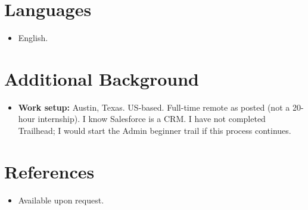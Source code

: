 \documentclass[11pt,a4paper,sans]{moderncv}
\begin{document}
\section{Languages}
\vspace{1pt}
\begin{itemize}
\item English.
\end{itemize}


\section{Additional Background}
\vspace{1pt}
\begin{itemize}
\item \textbf{Work setup:} Austin, Texas. US-based. Full-time remote as posted (not a 20-hour internship). I know Salesforce is a CRM. I have not completed Trailhead; I would start the Admin beginner trail if this process continues.
\end{itemize}


\section{References}
\vspace{1pt}
\begin{itemize}
\item Available upon request.
\end{itemize}
\end{document}
